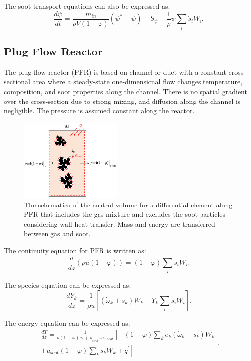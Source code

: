 The soot transport equations can also be expressed as:
\begin{equation}
	\frac{d\psi}{dt}
	=
	\frac{{\dot{m}}_{in}}{\rho V
	\left(1-\varphi\right)}
	\left(\psi^\ast-\psi\right)
	+
	S_{\psi}
	-\frac{1}{\rho}\psi\sum_{i}{{\dot{s}}_i W_i}
	\label{eqn:sootpsr}.
\end{equation}

\subsection{Plug Flow Reactor}
The plug flow reactor (PFR) is based on channel or duct with a constant cross-sectional area where a steady-state one-dimensional flow changes temperature, composition, and soot properties along the channel. There is no spatial gradient over the cross-section due to strong mixing, and  diffusion along the channel is negligible. The pressure is assumed constant along the reactor.
\begin{figure}[!htbp]
	\centering
	\includegraphics[height=40mm, ]{Figures/Theory/PFR.pdf}
	\caption{The schematics of the control volume for a differential element along PFR that includes the gas mixture and excludes the soot particles considering wall heat transfer. Mass and energy are transferred between gas and soot.}
	\label{fig:pfrcv}
\end{figure}

 

The continuity equation for PFR is written as:
\begin{equation}
	\frac{d}{dz}(\rho u(1-\varphi)) =(1-\varphi) \sum_i \dot s_i W_i
	\label{eqn:contpfr}.
\end{equation}

The species equation can be expressed as:
\begin{equation}
	\frac{d Y_k}{d z}=\frac{1}{\rho u}\left[\left(\dot{\omega}_k+\dot{s}_k\right) W_k-Y_k \sum_i \dot{s}_i W_i\right]
	\label{eqn:speciespfr}.
\end{equation}

The energy equation can be expressed as:
\begin{equation}
	\begin{split}
		\frac{d T}{d z}=
		\frac{1}{\rho (1-\varphi) c_v+\rho_{soot}\varphi 	c_{v,soot}}
		\left[
			-(1-\varphi)\sum_k e_k
			\left(
			\dot{\omega}_k+\dot{s}_k
			\right) W_k
		\right. \\
		\left.
			+u_{soot}(1-\varphi)\sum_k \dot{s}_k W_k
			+\dot{q}^\prime
		\right]
	\end{split}
	\label{eqn:energypfr}.
\end{equation}

